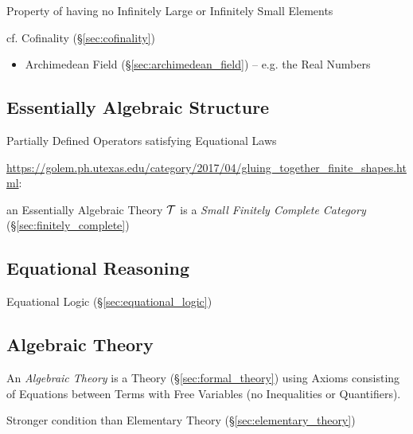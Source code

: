 Property of having no Infinitely Large or Infinitely Small Elements

cf. Cofinality (\S\ref{sec:cofinality})

\begin{itemize}
  \item Archimedean Field (\S\ref{sec:archimedean_field}) -- e.g. the Real
    Numbers
\end{itemize}



\subsection{Essentially Algebraic Structure}
\label{sec:essentially_algebraic}

Partially Defined Operators satisfying Equational Laws

\url{https://golem.ph.utexas.edu/category/2017/04/gluing_together_finite_shapes.html}:

an Essentially Algebraic Theory $\mathcal{T}$ is a \emph{Small Finitely
  Complete Category} (\S\ref{sec:finitely_complete})



\subsection{Equational Reasoning}\label{sec:equational_reasoning}

Equational Logic (\S\ref{sec:equational_logic})



\subsection{Algebraic Theory}\label{sec:algebraic_theory}

An \emph{Algebraic Theory} is a Theory (\S\ref{sec:formal_theory})
using Axioms consisting of Equations between Terms with Free Variables
(no Inequalities or Quantifiers).

Stronger condition than Elementary Theory
(\S\ref{sec:elementary_theory})

